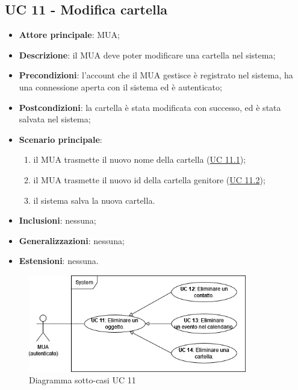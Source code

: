 \subsection{UC 11 - Modifica cartella} \label{sec:UC11}
\begin{itemize}
    \item \textbf{Attore principale}: MUA;
    \item \textbf{Descrizione}: il MUA deve poter modificare una cartella nel sistema;
    \item \textbf{Precondizioni}: l’account che il MUA gestisce è registrato nel sistema, ha una connessione aperta con il sistema ed è autenticato;
    \item \textbf{Postcondizioni}: la cartella è stata modificata con successo, ed è stata salvata nel sistema;
    \item \textbf{Scenario principale}:
        \begin{enumerate}
            \item il MUA trasmette il nuovo nome della cartella (\hyperref[sec:UC11.1]{UC 11.1});
            \item il MUA trasmette il nuovo id della cartella genitore (\hyperref[sec:UC11.2]{UC 11.2});
            \item il sistema salva la nuova cartella.
        \end{enumerate}
    \item \textbf{Inclusioni}: nessuna;
    \item \textbf{Generalizzazioni}: nessuna;
    \item \textbf{Estensioni}: nessuna.
\end{itemize}

\begin{figure}[H]
    \includegraphics[width=0.85\textwidth]{sections/uc_imgs/UC11.png}
    \centering
    \caption{Diagramma sotto-casi UC 11}
\end{figure}

